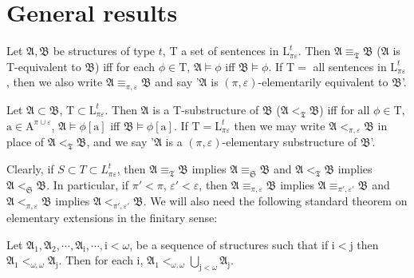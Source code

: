\documentclass{article}
\begin{document}
{{\section{General results}
\begin{definition}
Let $\mathfrak{A}, \mathfrak{B}$ be structures of type $t$, $\mathrm{T}$ a set of sentences in $\mathrm{L}_{\pi \varepsilon}^{t}$. Then $\mathfrak{A} \equiv_{\mathfrak{T}} \mathfrak{B}$ ($\mathfrak{A}$ is T-equivalent to $\mathfrak{B}$) iff for each $\phi \in \mathrm{T}$, $\mathfrak{A} \vDash \phi$ iff $\mathfrak{B} \vDash \phi$. If $\mathrm{T}=$ all sentences in $\mathrm{L}_{\pi \varepsilon}^{t}$, then we also write $\mathfrak{A} \equiv_{\pi, \varepsilon} \mathfrak{B}$ and say '$\mathfrak{A}$ is $(\pi, \varepsilon)$-elementarily equivalent to $\mathfrak{B}$'.
\end{definition}
\begin{definition}
Let $\mathfrak{A} \subset \mathfrak{B}$, $\mathrm{T} \subset \mathrm{L}_{\pi \varepsilon}^{t}$. Then $\mathfrak{A}$ is a T-substructure of $\mathfrak{B}$ ($\mathfrak{A} <_{\mathfrak{T}} \mathfrak{B}$) iff for all $\phi \in \mathrm{T}$, $\mathrm{a} \in \mathrm{A}^{\pi \cup \varepsilon}$, $\mathfrak{A} \vDash \phi[\mathrm{a}]$ iff $\mathfrak{B} \vDash \phi[\mathrm{a}]$. If $\mathrm{T}=\mathrm{L}_{\pi \varepsilon}^{t}$ then we may write $\mathfrak{A} <_{\pi, \varepsilon} \mathfrak{B}$ in place of $\mathfrak{A} <_{\mathfrak{T}} \mathfrak{B}$, and we say '$\mathfrak{A}$ is a $(\pi, \varepsilon)$-elementary substructure of $\mathfrak{B}$'.
\end{definition}
Clearly, if $S \subset T \subset L_{\pi \varepsilon}^{t}$, then $\mathfrak{A} \equiv_{\mathfrak{T}} \mathfrak{B}$ implies $\mathfrak{A} \equiv_{\mathfrak{S}} \mathfrak{B}$ and $\mathfrak{A} <_{\mathfrak{T}} \mathfrak{B}$ implies $\mathfrak{A} <_{\mathfrak{S}} \mathfrak{B}$. In particular, if $\pi'<\pi$, $\varepsilon'<\varepsilon$, then $\mathfrak{A} \equiv_{\pi, \varepsilon} \mathfrak{B}$ implies $\mathfrak{A} \equiv_{\pi', \varepsilon'} \mathfrak{B}$ and $\mathfrak{A} <_{\pi, \varepsilon} \mathfrak{B}$ implies $\mathfrak{A} <_{\pi', \varepsilon'} \mathfrak{B}$. We will also need the following standard theorem on elementary extensions in the finitary sense:
\begin{theorem}
Let $\mathfrak{A}_{1}, \mathfrak{A}_{2}, \cdots, \mathfrak{A}_{\mathrm{i}}, \cdots, \mathrm{i}<\omega$, be a sequence of structures such that if $\mathrm{i}<\mathrm{j}$ then $\mathfrak{A}_{1} <_{\omega, \omega} \mathfrak{A}_{\mathrm{j}}$. Then for each $\mathrm{i}$, $\mathfrak{A}_{1} <_{\omega, \omega} \bigcup_{\mathrm{j}<\omega} \mathfrak{A}_{\mathrm{j}}$.

\end{theorem}}}
\end{document}
